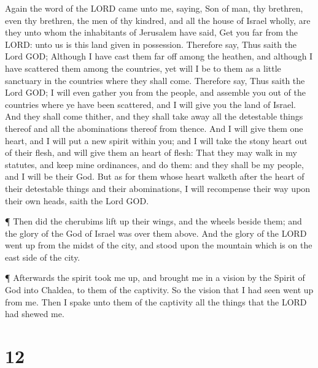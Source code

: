  Again the word of the LORD came unto me, saying,
 Son of man, thy brethren, even thy brethren, the men of
thy kindred, and all the house of Israel wholly, are they unto whom the
inhabitants of Jerusalem have said, Get you far from the LORD: unto us
is this land given in possession.  Therefore say, Thus
saith the Lord GOD; Although I have cast them far off among the heathen,
and although I have scattered them among the countries, yet will I be to
them as a little sanctuary in the countries where they shall come.
 Therefore say, Thus saith the Lord GOD; I will even gather
you from the people, and assemble you out of the countries where ye have
been scattered, and I will give you the land of Israel. 
And they shall come thither, and they shall take away all the detestable
things thereof and all the abominations thereof from thence.
 And I will give them one heart, and I will put a new
spirit within you; and I will take the stony heart out of their flesh,
and will give them an heart of flesh:  That they may walk
in my statutes, and keep mine ordinances, and do them: and they shall be
my people, and I will be their God.  But as for them whose
heart walketh after the heart of their detestable things and their
abominations, I will recompense their way upon their own heads, saith
the Lord GOD.

 ¶ Then did the cherubims lift up their wings, and the
wheels beside them; and the glory of the God of Israel was over them
above.  And the glory of the LORD went up from the midst of
the city, and stood upon the mountain which is on the east side of the
city.

 ¶ Afterwards the spirit took me up, and brought me in a
vision by the Spirit of God into Chaldea, to them of the captivity. So
the vision that I had seen went up from me.  Then I spake
unto them of the captivity all the things that the LORD had shewed me.

\hypertarget{section-11}{%
\section{12}\label{section-11}}

